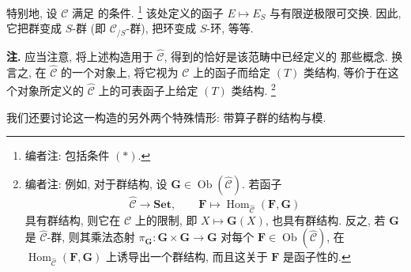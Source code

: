 特别地, 设 \(\mathscr C\) 满足  的条件.
\footnote{编者注: 包括条件 \((*)\).} 该处定义的函子 \(E\mapsto E_S\)
与有限逆极限可交换. 因此, 它把群变成 \(S\)-群 (即 \(\mathscr C_{/S}\)-群),
把环变成 \(S\)-环, 等等.

\medskip
\noindent\textbf{注.}
应当注意, 将上述构造用于 \(\widehat{\mathscr C}\), 得到的恰好是该范畴中已经定义的
那些概念. 换言之, 在 \(\widehat{\mathscr C}\) 的一个对象上, 将它视为
\(\mathscr C\) 上的函子而给定 \((T)\) 类结构, 等价于在这个对象所定义的
\(\widehat{\mathscr C}\) 上的可表函子上给定 \((T)\) 类结构.
\footnote{编者注: 例如, 对于群结构, 设
\(\mathbf G\in\operatorname{Ob}(\widehat{\mathscr C})\). 若函子
\[
  \widehat{\mathscr C}\longrightarrow\mathbf{Set},
  \qquad
  \mathbf F\longmapsto
  \operatorname{Hom}_{\widehat{\mathscr C}}(\mathbf F,\mathbf G)
\]
具有群结构, 则它在 \(\mathscr C\) 上的限制, 即 \(X\mapsto\mathbf G(X)\),
也具有群结构. 反之, 若 \(\mathbf G\) 是 \(\widehat{\mathscr C}\)-群, 则其乘法态射
\(\pi_{\mathbf G}:\mathbf G\times\mathbf G\to\mathbf G\) 对每个
\(\mathbf F\in\operatorname{Ob}(\widehat{\mathscr C})\), 在
\(\operatorname{Hom}_{\widehat{\mathscr C}}(\mathbf F,\mathbf G)\) 上诱导出一个群结构,
而且这关于 \(\mathbf F\) 是函子性的.}

我们还要讨论这一构造的另外两个特殊情形: 带算子群的结构与模.

